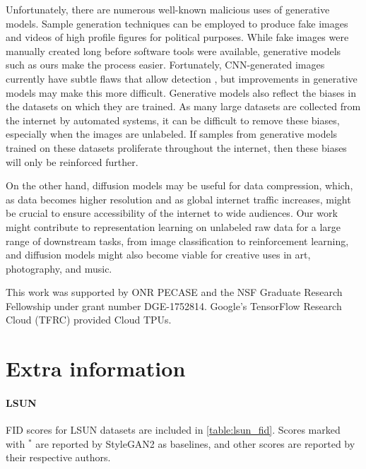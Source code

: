 \documentclass{article}
\begin{document}
Unfortunately, there are numerous well-known malicious uses of generative models. Sample generation techniques can be employed to produce fake images and videos of high profile figures for political purposes. While fake images were manually created long before software tools were available, generative models such as ours make the process easier. Fortunately, CNN-generated images currently have subtle flaws that allow detection \cite{wang2019cnngenerated}, but improvements in generative models may make this more difficult.
Generative models also reflect the biases in the datasets on which they are trained. As many large datasets are collected from the internet by automated systems, it can be difficult to remove these biases, especially when the images are unlabeled. If samples from generative models trained on these datasets proliferate throughout the internet, then these biases will only be reinforced further.

On the other hand, diffusion models may be useful for data compression, which, as data becomes higher resolution and as global internet traffic increases, might be crucial to ensure accessibility of the internet to wide audiences. Our work might contribute to representation learning on unlabeled raw data for a large range of downstream tasks, from image classification to reinforcement learning, and diffusion models might also become viable for creative uses in art, photography, and music.

\begin{ack}
This work was supported by ONR PECASE and the NSF Graduate Research Fellowship under grant number DGE-1752814. Google's TensorFlow Research Cloud (TFRC) provided Cloud TPUs.
\end{ack}

\setlength{\bibsep}{5pt}

{\small }

\pagebreak
\appendix

\section*{Extra information}

\paragraph{LSUN}

FID scores for LSUN datasets are included in \cref{table:lsun_fid}. Scores marked with $^{*}$ are reported by StyleGAN2 as baselines, and other scores are reported by their respective authors.
\end{document}
